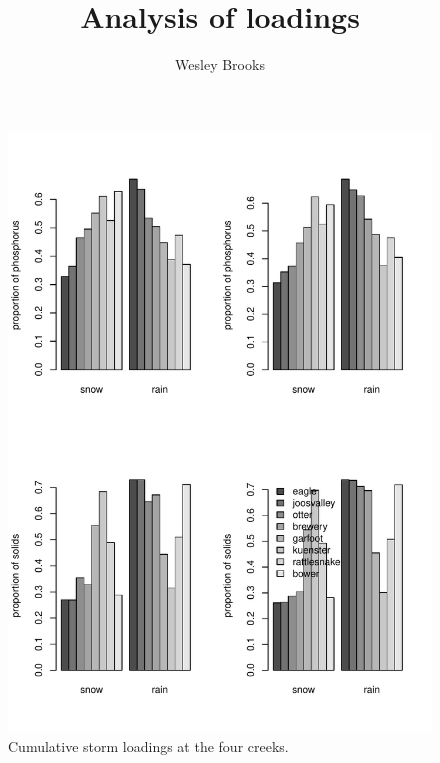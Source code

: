 \documentclass[10pt]{article}
\title{Analysis of loadings}
\author{Wesley Brooks}
\date{}                                           %
\begin{document}
\maketitle
















\begin{figure}[h!]
    \begin{center}
\includegraphics{loadings-fig2}
    \end{center}
    \vspace{-10mm}
    \caption{Cumulative storm loadings at the four creeks.\label{bars}}
\end{figure}
\end{document}
